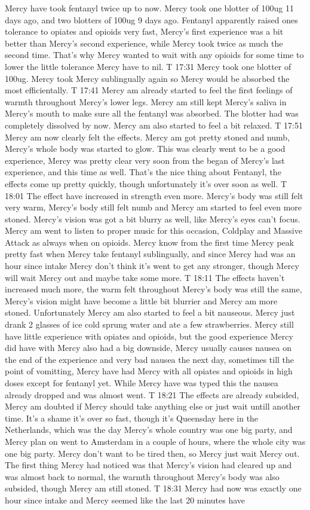 \documentclass[12pt]{book}
\begin{document}
Mercy have took fentanyl twice up to now. Mercy took one blotter of 100ug 11 days ago, and two blotters of 100ug 9 days ago. Fentanyl apparently raised ones tolerance to opiates and opioids very fast, Mercy's first experience was a bit better than Mercy's second experience, while Mercy took twice as much the second time. That's why Mercy wanted to wait with any opioids for some time to lower the little tolerance Mercy have to nil. T 17:31 Mercy took one blotter of 100ug. Mercy took Mercy sublingually again so Mercy would be absorbed the most efficientally. T 17:41 Mercy am already started to feel the first feelings of warmth throughout Mercy's lower legs. Mercy am still kept Mercy's saliva in Mercy's mouth to make sure all the fentanyl was absorbed. The blotter had was completely dissolved by now. Mercy am also started to feel a bit relaxed. T 17:51 Mercy am now clearly felt the effects. Mercy am got pretty stoned and numb, Mercy's whole body was started to glow. This was clearly went to be a good experience, Mercy was pretty clear very soon from the began of Mercy's last experience, and this time as well. That's the nice thing about Fentanyl, the effects come up pretty quickly, though unfortunately it's over soon as well. T 18:01 The effect have increased in strength even more. Mercy's body was still felt very warm, Mercy's body still felt numb and Mercy am started to feel even more stoned. Mercy's vision was got a bit blurry as well, like Mercy's eyes can't focus. Mercy am went to listen to proper music for this occasion, Coldplay and Massive Attack as always when on opioids. Mercy know from the first time Mercy peak pretty fast when Mercy take fentanyl sublingually, and since Mercy had was an hour since intake Mercy don't think it's went to get any stronger, though Mercy will wait Mercy out and maybe take some more. T 18:11 The effects haven't increased much more, the warm felt throughout Mercy's body was still the same, Mercy's vision might have become a little bit blurrier and Mercy am more stoned. Unfortunately Mercy am also started to feel a bit nauseous. Mercy just drank 2 glasses of ice cold sprung water and ate a few strawberries. Mercy still have little experience with opiates and opioids, but the good experience Mercy did have with Mercy also had a big downside, Mercy usually causes nausea on the end of the experience and very bad nausea the next day, sometimes till the point of vomitting, Mercy have had Mercy with all opiates and opioids in high doses except for fentanyl yet. While Mercy have was typed this the nausea already dropped and was almost went. T 18:21 The effects are already subsided, Mercy am doubted if Mercy should take anything else or just wait untill another time. It's a shame it's over so fast, though it's Queensday here in the Netherlands, which was the day Mercy's whole country was one big party, and Mercy plan on went to Amsterdam in a couple of hours, where the whole city was one big party. Mercy don't want to be tired then, so Mercy just wait Mercy out. The first thing Mercy had noticed was that Mercy's vision had cleared up and was almost back to normal, the warmth throughout Mercy's body was also subsided, though Mercy am still stoned. T 18:31 Mercy had now was exactly one hour since intake and Mercy seemed like the last 20 minutes have 
\end{document}
